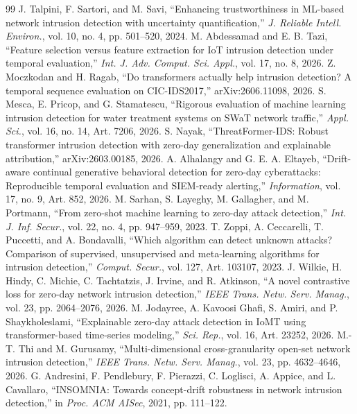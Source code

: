 \documentclass[conference]{IEEEtran}
\begin{document}
\begin{thebibliography}{99}
 J. Talpini, F. Sartori, and M. Savi, ``Enhancing trustworthiness in ML-based network intrusion detection with uncertainty quantification,'' \emph{J. Reliable Intell. Environ.}, vol. 10, no. 4, pp. 501--520, 2024.
 M. Abdessamad and E. B. Tazi, ``Feature selection versus feature extraction for IoT intrusion detection under temporal evaluation,'' \emph{Int. J. Adv. Comput. Sci. Appl.}, vol. 17, no. 8, 2026.
 Z. Moczkodan and H. Ragab, ``Do transformers actually help intrusion detection? A temporal sequence evaluation on CIC-IDS2017,'' arXiv:2606.11098, 2026.
 S. Mesca, E. Pricop, and G. Stamatescu, ``Rigorous evaluation of machine learning intrusion detection for water treatment systems on SWaT network traffic,'' \emph{Appl. Sci.}, vol. 16, no. 14, Art. 7206, 2026.
 S. Nayak, ``ThreatFormer-IDS: Robust transformer intrusion detection with zero-day generalization and explainable attribution,'' arXiv:2603.00185, 2026.
 A. Alhalangy and G. E. A. Eltayeb, ``Drift-aware continual generative behavioral detection for zero-day cyberattacks: Reproducible temporal evaluation and SIEM-ready alerting,'' \emph{Information}, vol. 17, no. 9, Art. 852, 2026.
 M. Sarhan, S. Layeghy, M. Gallagher, and M. Portmann, ``From zero-shot machine learning to zero-day attack detection,'' \emph{Int. J. Inf. Secur.}, vol. 22, no. 4, pp. 947--959, 2023.
 T. Zoppi, A. Ceccarelli, T. Puccetti, and A. Bondavalli, ``Which algorithm can detect unknown attacks? Comparison of supervised, unsupervised and meta-learning algorithms for intrusion detection,'' \emph{Comput. Secur.}, vol. 127, Art. 103107, 2023.
 J. Wilkie, H. Hindy, C. Michie, C. Tachtatzis, J. Irvine, and R. Atkinson, ``A novel contrastive loss for zero-day network intrusion detection,'' \emph{IEEE Trans. Netw. Serv. Manag.}, vol. 23, pp. 2064--2076, 2026.
 M. Jodayree, A. Kavoosi Ghafi, S. Amiri, and P. Shaykholeslami, ``Explainable zero-day attack detection in IoMT using transformer-based time-series modeling,'' \emph{Sci. Rep.}, vol. 16, Art. 23252, 2026.
 M.-T. Thi and M. Gurusamy, ``Multi-dimensional cross-granularity open-set network intrusion detection,'' \emph{IEEE Trans. Netw. Serv. Manag.}, vol. 23, pp. 4632--4646, 2026.
 G. Andresini, F. Pendlebury, F. Pierazzi, C. Loglisci, A. Appice, and L. Cavallaro, ``INSOMNIA: Towards concept-drift robustness in network intrusion detection,'' in \emph{Proc. ACM AISec}, 2021, pp. 111--122.

\end{thebibliography}
\end{document}
